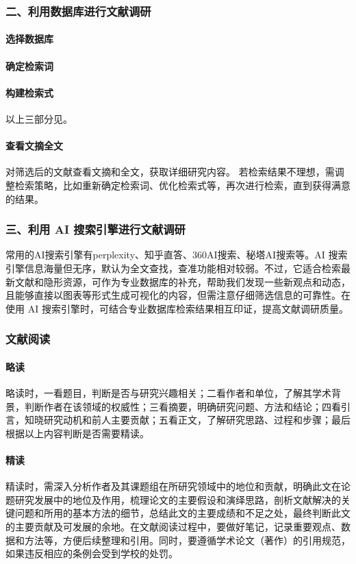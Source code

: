 \subsubsection*{二、利用数据库进行文献调研}
\paragraph{选择数据库}
\paragraph{确定检索词}
\paragraph{构建检索式}
以上三部分见。
\paragraph{查看文摘全文}
对筛选后的文献查看文摘和全文，获取详细研究内容。
若检索结果不理想，需调整检索策略，比如重新确定检索词、优化检索式等，再次进行检索，直到获得满意的结果。
\subsubsection*{三、利用 AI 搜索引擎进行文献调研}
常用的AI搜索引擎有perplexity、知乎直答、360AI搜索、秘塔AI搜索等。AI 搜索引擎信息海量但无序，默认为全文查找，查准功能相对较弱。不过，它适合检索最新文献和隐形资源，可作为专业数据库的补充，帮助我们发现一些新观点和动态，且能够直接以图表等形式生成可视化的内容，但需注意仔细筛选信息的可靠性。在使用 AI 搜索引擎时，可结合专业数据库检索结果相互印证，提高文献调研质量。
\subsubsection*{文献阅读}
\paragraph{略读}
略读时，一看题目，判断是否与研究兴趣相关；二看作者和单位，了解其学术背景，判断作者在该领域的权威性；三看摘要，明确研究问题、方法和结论；四看引言，知晓研究动机和前人主要贡献；五看正文，了解研究思路、过程和步骤；最后根据以上内容判断是否需要精读。
\paragraph{精读}
精读时，需深入分析作者及其课题组在所研究领域中的地位和贡献，明确此文在论题研究发展中的地位及作用，梳理论文的主要假设和演绎思路，剖析文献解决的关键问题和所用的基本方法的细节，总结此文的主要成绩和不足之处，最终判断此文的主要贡献及可发展的余地。在文献阅读过程中，要做好笔记，记录重要观点、数据和方法等，方便后续整理和引用。同时，要遵循学术论文（著作）的引用规范，如果违反相应的条例会受到学校的处罚。
